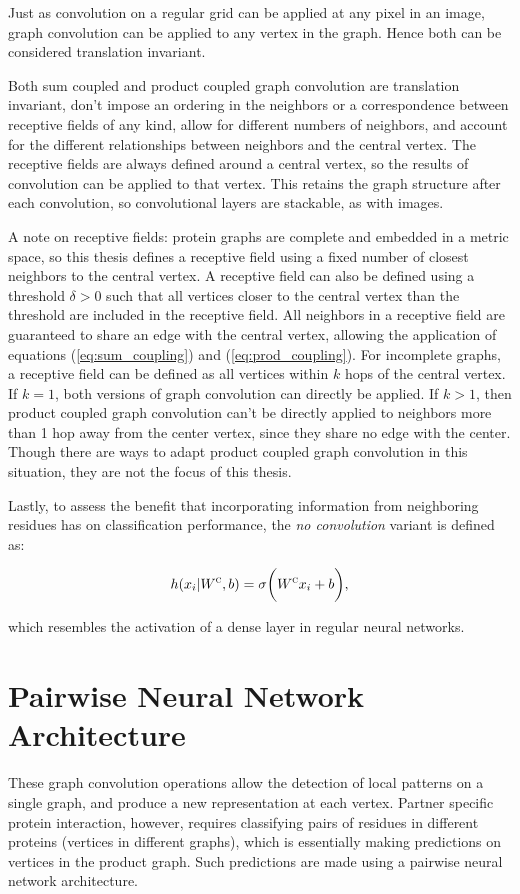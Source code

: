 Just as convolution on a regular grid can be applied at any pixel in an image, graph convolution can be applied to any vertex in the graph.
Hence both can be considered translation invariant.

Both sum coupled and product coupled graph convolution are translation invariant, don't impose an ordering in the neighbors or a correspondence between receptive fields of any kind, allow for different numbers of neighbors, and account for the different relationships between neighbors and the central vertex. 
The receptive fields are always defined around a central vertex, so the results of convolution can be applied to that vertex.
This retains the graph structure after each convolution, so convolutional layers are stackable, as with images.

A note on receptive fields: protein graphs are complete and embedded in a metric space, so this thesis defines a receptive field using a fixed number of closest neighbors to the central vertex.
A receptive field can also be defined using a threshold $\delta>0$ such that all vertices closer to the central vertex than the threshold are included in the receptive field.
All neighbors in a receptive field are guaranteed to share an edge with the central vertex, allowing the application of equations (\ref{eq:sum_coupling}) and (\ref{eq:prod_coupling}).
For incomplete graphs, a receptive field can be defined as all vertices within $k$ hops of the central vertex. 
If $k=1$, both versions of graph convolution can directly be applied.
If $k>1$, then product coupled graph convolution can't be directly applied to neighbors more than 1 hop away from the center vertex, since they share no edge with the center. 
Though there are ways to adapt product coupled graph convolution in this situation, they are not the focus of this thesis.

Lastly, to assess the benefit that incorporating information from neighboring residues has on classification performance, the \emph{no convolution} variant is defined as:

\begin{equation}
h(x_i | W^\textsc{c}, b)= \sigma \bigg( W^{\textsc{c}} x_i + b \bigg),
\label{eq:no_conv}
\end{equation}

\noindent
which resembles the activation of a dense layer in regular neural networks.


\section{Pairwise Neural Network Architecture}
These graph convolution operations allow the detection of local patterns on a single graph, and produce a new representation at each vertex.
Partner specific protein interaction, however, requires classifying pairs of residues in different proteins (vertices in different graphs), which is essentially making predictions on vertices in the product graph. 
Such predictions are made using a pairwise neural network architecture.

